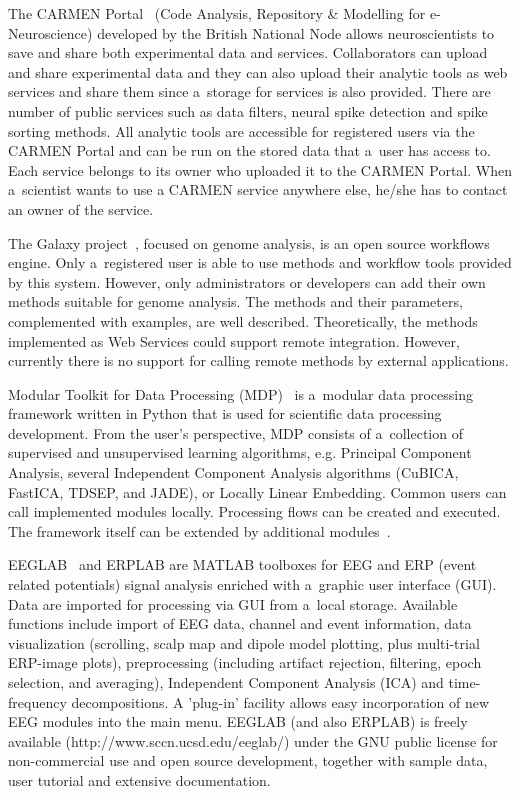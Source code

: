\documentclass{frontiersSCNS} %
\begin{document}
The CARMEN Portal~\cite{Watson07} (Code Analysis, Repository \& Modelling for e-Neuroscience) developed by the British National Node allows neuroscientists to save and share both experimental data and services. Collaborators can upload and share experimental data and they can also upload their analytic tools as web services and share them since a~storage for services is also provided. There are number of public services such as data filters, neural spike detection and spike sorting methods. All analytic tools are accessible for registered users via the CARMEN Portal and can be run on the stored data that a~user has access to. Each service belongs to its owner who uploaded it to the CARMEN Portal. When a~scientist wants to use a CARMEN service anywhere else, he/she has to contact an owner of the service.

The Galaxy project~\cite{goecks2010galaxy, blankenberg2010galaxy, giardine2005galaxy}, focused on genome analysis, is an open source workflows engine. Only a~registered user is able to use methods and workflow tools provided by this system. However, only administrators or developers can add their own methods suitable for genome analysis. The methods and their parameters, complemented with examples, are well described. Theoretically, the methods implemented as Web Services could support remote integration. However, currently there is no support for calling remote methods by external applications.

Modular Toolkit for Data Processing (MDP)~\cite{Zito08} is a~modular data processing framework written in Python that is used for scientific data processing development. From the user’s perspective, MDP consists of a~collection of supervised and unsupervised learning algorithms, e.g. Principal Component Analysis, several Independent Component Analysis algorithms (CuBICA, FastICA, TDSEP, and JADE), or Locally Linear Embedding. Common users can call implemented modules locally. Processing flows can be created and executed. The framework itself can be extended by additional modules~\cite{MDP12}.

EEGLAB~\cite{Delorme04} and ERPLAB are MATLAB toolboxes for EEG and ERP (event related potentials) signal analysis enriched with a~graphic user interface (GUI). Data are imported for processing via GUI from a~local storage. Available functions include import of EEG data, channel and event information, data visualization (scrolling, scalp map and dipole model plotting, plus multi-trial ERP-image plots), preprocessing (including artifact rejection, filtering, epoch selection, and averaging), Independent Component Analysis (ICA) and time-frequency decompositions. A 'plug-in' facility allows easy incorporation of new EEG modules into the main menu. EEGLAB (and also ERPLAB) is freely available (http://www.sccn.ucsd.edu/eeglab/) under the GNU public license for non-commercial use and open source development, together with sample data, user tutorial and extensive documentation.
\end{document}
